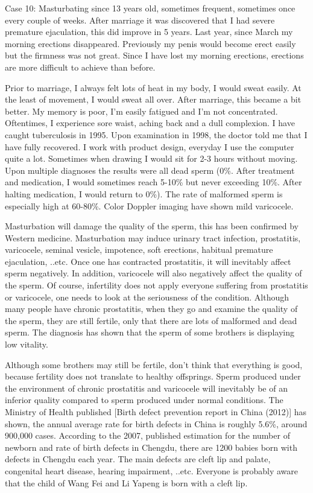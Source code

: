 \documentclass[
]{book}
\begin{document}
Case 10: Masturbating since 13 years old, sometimes frequent, sometimes once every couple of weeks. After marriage it was discovered that I had severe premature ejaculation, this did improve in 5 years. Last year, since March my morning erections disappeared. Previously my penis would become erect easily but the firmness was not great. Since I have lost my morning erections, erections are more difficult to achieve than before.

Prior to marriage, I always felt lots of heat in my body, I would sweat easily. At the least of movement, I would sweat all over. After marriage, this became a bit better. My memory is poor, I'm easily fatigued and I'm not concentrated. Oftentimes, I experience sore waist, aching back and a dull complexion. I have caught tuberculosis in 1995. Upon examination in 1998, the doctor told me that I have fully recovered. I work with product design, everyday I use the computer quite a lot. Sometimes when drawing I would sit for 2-3 hours without moving. Upon multiple diagnoses the results were all dead sperm (0\%. After treatment and medication, I would sometimes reach 5-10\% but never exceeding 10\%. After halting medication, I would return to 0\%). The rate of malformed sperm is especially high at 60-80\%. Color Doppler imaging have shown mild varicocele.

Masturbation will damage the quality of the sperm, this has been confirmed by Western medicine. Masturbation may induce urinary tract infection, prostatitis, varicocele, seminal vesicle, impotence, soft erections, habitual premature ejaculation, ..etc. Once one has contracted prostatitis, it will inevitably affect sperm negatively. In addition, varicocele will also negatively affect the quality of the sperm. Of course, infertility does not apply everyone suffering from prostatitis or varicocele, one needs to look at the seriousness of the condition. Although many people have chronic prostatitis, when they go and examine the quality of the sperm, they are still fertile, only that there are lots of malformed and dead sperm. The diagnosis has shown that the sperm of some brothers is displaying low vitality.

Although some brothers may still be fertile, don't think that everything is good, because fertility does not translate to healthy offsprings. Sperm produced under the environment of chronic prostatitis and varicocele will inevitably be of an inferior quality compared to sperm produced under normal conditions. The Ministry of Health published {[}Birth defect prevention report in China (2012){]} has shown, the annual average rate for birth defects in China is roughly 5.6\%, around 900,000 cases. According to the 2007, published estimation for the number of newborn and rate of birth defects in Chengdu, there are 1200 babies born with defects in Chengdu each year. The main defects are cleft lip and palate, congenital heart disease, hearing impairment, ..etc. Everyone is probably aware that the child of Wang Fei and Li Yapeng is born with a cleft lip.
\end{document}
